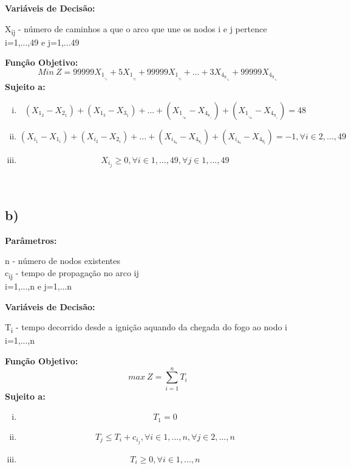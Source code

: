 \documentclass[11pt]{article} %
\begin{document}
\newpage

\textbf{Variáveis de Decisão:} \\
\begin{center}
X\textsubscript{ij} - número de caminhos a que o arco que une os nodos i e j pertence\\
i=1,...,49 e j=1,...49 \\
\end{center}
\textbf{Função Objetivo:}
$$Min \ Z = 99999X_1_,_1 + 5X_1_,_2+99999X_1_,_3+...+3X_4_9_,_4_8+99999X_4_9_,_4_9$$
\textbf{Sujeito a:}
\begin{enumerate}[(i)]
\item $$(X_1_2-X_2_1)+(X_1_3-X_3_1)+...+(X_1_,_4_8-X_4_8_,_1)+(X_1_,_4_9-X_4_9_,_1)=48$$
\item $$(X_i_1-X_1_i)+(X_i_2-X_2_i)+...+(X_i_4_8-X_4_8_i)+(X_i_4_9-X_4_9_i)=-1, \forall i \in 2,...,49 $$
\item $$X_i_j \geq 0, \forall i \in 1,...,49, \forall j \in 1,...,49$$
\end{enumerate}\\

\subsection*{b)}

\textbf{Parâmetros:}
\begin{center}
n - número de nodos existentes \\
c\textsubscript{ij} - tempo de propagação no arco ij\\
i=1,...,n e j=1,...n \\
\end{center}
\textbf{Variáveis de Decisão:} \\
\begin{center}
T\textsubscript{i} - tempo decorrido desde a ignição aquando da chegada do fogo ao nodo i\\
i=1,...,n\\
\end{center}
\textbf{Função Objetivo:}
$$max \ Z = \sum_{i=1}^{n} T_i$$
\textbf{Sujeito a:}
\begin{enumerate}[(i)]
\item $$T_1 = 0$$
\item $$T_j \leq T_i + c_i_j, \forall i \in 1,...,n , \forall j \in 2,...,n$$
\item $$T_i \geq 0, \forall i \in 1,...,n$$
\end{enumerate}
\end{document}
